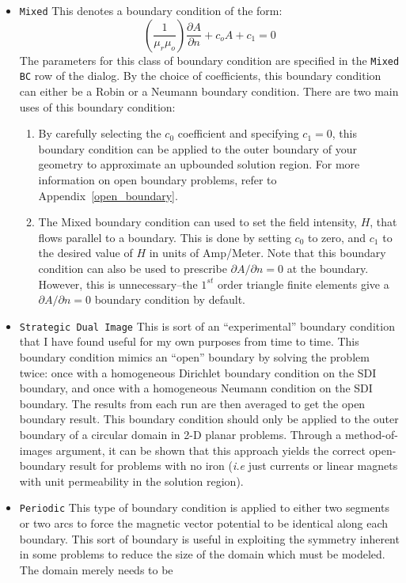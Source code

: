 \documentclass[12pt]{report}
\newcommand{\be}{\begin{equation}}
\newcommand{\ee}{\end{equation}}
\begin{document}
\begin{itemize}
\item {\tt Mixed}
This denotes a boundary condition of the form:
\be \left( \frac{1}{\mu_r \mu_o} \right) \frac{\partial A}{\partial n}
 + c_o A + c_1 = 0 \ee
The parameters for this class of boundary condition are specified
in the {\tt Mixed BC} row of the dialog. By the choice
of coefficients, this boundary condition can either be a Robin or a
Neumann boundary condition. There are two main uses of this
boundary condition:
\begin{enumerate}
\item By carefully selecting the $c_0$ coefficient and specifying
$c_1 = 0$, this boundary condition can be applied to the outer
boundary of your geometry to approximate an upbounded solution
region.  For more information on open boundary problems, refer to
Appendix~\ref{open_boundary}.
\item The Mixed boundary condition can used to
set the field intensity, $H$, that flows parallel to a boundary.
This is done by setting $c_0$ to zero, and $c_1$ to the desired
value of $H$ in units of Amp/Meter. Note that this boundary
condition can also be used to prescribe $\partial A/\partial n=0$
at the boundary. However, this is unnecessary--the $1^{st}$ order
triangle finite elements give a $\partial A/\partial n=0$ boundary
condition by default.
\end{enumerate}
\item {\tt Strategic Dual Image}
This is sort of an ``experimental'' boundary condition that I have
found useful for my own purposes from time to time.  This boundary
condition mimics an ``open'' boundary by solving the problem
twice: once with a homogeneous Dirichlet boundary condition on the
SDI boundary, and once with a homogeneous Neumann condition on the
SDI boundary.  The results from each run are then averaged to get
the open boundary result.  This boundary condition should only be
applied to the outer boundary of a circular domain in 2-D planar
problems.  Through a method-of-images argument, it can be shown
that this approach yields the correct open-boundary result for
problems with no iron ({\em i.e} just currents or linear magnets
with unit permeability in the solution region).
\item{\tt Periodic}
This type of boundary condition is applied to either two segments
or two arcs to force the magnetic vector potential to be identical
along each boundary.  This sort of boundary is useful in exploiting
the symmetry inherent in some problems to reduce the size of the
domain which must be modeled.    The domain merely needs to be

\end{itemize}
\end{document}
